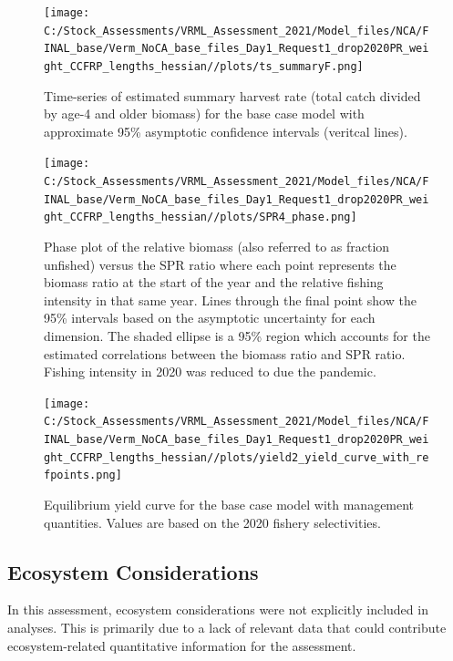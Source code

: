 \documentclass[
  english,
  a4paper,
]{article}
\begin{document}
\begin{figure}
\centering
\texttt{[image: C:/Stock\_Assessments/VRML\_Assessment\_2021/Model\_files/NCA/FINAL\_base/Verm\_NoCA\_base\_files\_Day1\_Request1\_drop2020PR\_weight\_CCFRP\_lengths\_hessian//plots/ts\_summaryF.png]}
\caption{Time-series of estimated summary harvest rate (total catch divided by age-4 and older biomass) for the base case model with approximate 95\% asymptotic confidence intervals (veritcal lines).\label{fig:FmortalityES}}
\end{figure}

\begin{figure}
\centering
\texttt{[image: C:/Stock\_Assessments/VRML\_Assessment\_2021/Model\_files/NCA/FINAL\_base/Verm\_NoCA\_base\_files\_Day1\_Request1\_drop2020PR\_weight\_CCFRP\_lengths\_hessian//plots/SPR4\_phase.png]}
\caption{Phase plot of the relative biomass (also referred to as fraction unfished) versus the SPR ratio where each point represents the biomass ratio at the start of the year and the relative fishing intensity in that same year. Lines through the final point show the 95\% intervals based on the asymptotic uncertainty for each dimension. The shaded ellipse is a 95\% region which accounts for the estimated correlations between the biomass ratio and SPR ratio. Fishing intensity in 2020 was reduced to due the pandemic.\label{fig:phaseES}}
\end{figure}

\begin{figure}
\centering
\texttt{[image: C:/Stock\_Assessments/VRML\_Assessment\_2021/Model\_files/NCA/FINAL\_base/Verm\_NoCA\_base\_files\_Day1\_Request1\_drop2020PR\_weight\_CCFRP\_lengths\_hessian//plots/yield2\_yield\_curve\_with\_refpoints.png]}
\caption{Equilibrium yield curve for the base case model with management quantities. Values are based on the 2020
fishery selectivities.\label{fig:yield2ES}}
\end{figure}

\FloatBarrier

\hypertarget{ecosystem-considerations}{%
\subsection*{Ecosystem Considerations}\label{ecosystem-considerations}}

In this assessment, ecosystem considerations were not explicitly included in analyses.
This is primarily due to a lack of relevant data that could contribute ecosystem-related quantitative information for the assessment.
\end{document}
